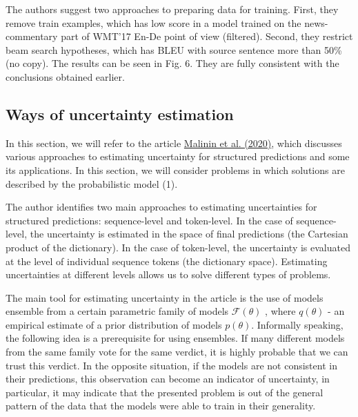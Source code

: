 \documentclass[a4paper,14pt]{extarticle}
\newcommand{\bibref}[3]{\hyperlink{#1}{#2 (#3)}}
\begin{document}
	The authors suggest two approaches to preparing data for training. First, they remove train examples, which has low score in a model trained on the news-commentary part of WMT'17 En-De point of view (filtered). Second, they restrict beam search hypotheses, which has BLEU with source sentence more than 50\% (no copy). The results can be seen in Fig. 6. They are fully consistent with the conclusions obtained earlier.
	\begin{figure}[H]
	\end{figure}
	\subsection{Ways of uncertainty estimation}
	In this section, we will refer to the article \bibref{uncertainty}{Malinin et al.} {2020}, which discusses various approaches to estimating uncertainty for structured predictions and some its applications. In this section, we will consider problems in which solutions are described by the probabilistic model (1).

	The author identifies two main approaches to estimating uncertainties for structured predictions: sequence-level and token-level. In the case of sequence-level, the uncertainty is estimated in the space of final predictions (the Cartesian product of the dictionary). In the case of token-level, the uncertainty is evaluated at the level of individual sequence tokens (the dictionary space). Estimating uncertainties at different levels allows us to solve different types of problems.
	
	The main tool for estimating uncertainty in the article is the use of models ensemble from a certain parametric family of models $\mathcal{F}(\theta)$ , where $q(\theta)$ - an empirical estimate of a prior distribution of models $p(\theta)$. Informally speaking, the following idea is a prerequisite for using ensembles. If many different models from the same family vote for the same verdict, it is highly probable that we can trust this verdict. In the opposite situation, if the models are not consistent in their predictions, this observation can become an indicator of uncertainty, in particular, it may indicate that the presented problem is out of the general pattern of the data that the models were able to train in their generality.
\end{document}
